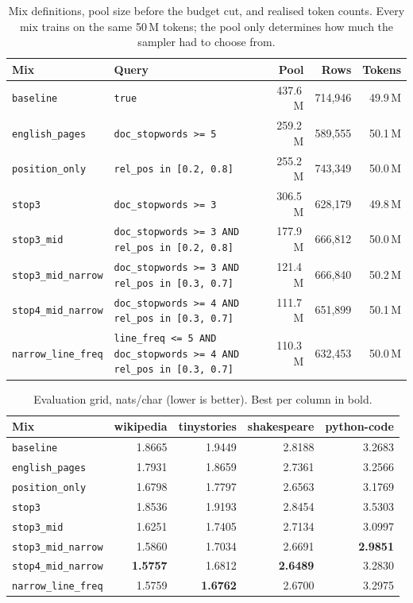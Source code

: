 \documentclass[10pt]{article}
\begin{document}
\begin{table}[htbp]
\caption{Mix definitions, pool size before the budget cut, and realised
token counts. Every mix trains on the same 50\,M tokens; the pool only
determines how much the sampler had to choose from.}
\label{tab:mixes}
\centering
\small
\begin{tabular}{llrrr}
\toprule
Mix & Query & Pool & Rows & Tokens \\
\midrule
\texttt{baseline}           & \texttt{true} & 437.6\,M & 714{,}946 & 49.9\,M \\
\texttt{english\_pages}     & \texttt{doc\_stopwords >= 5} & 259.2\,M & 589{,}555 & 50.1\,M \\
\texttt{position\_only}     & \texttt{rel\_pos in [0.2, 0.8]} & 255.2\,M & 743{,}349 & 50.0\,M \\
\texttt{stop3}              & \texttt{doc\_stopwords >= 3} & 306.5\,M & 628{,}179 & 49.8\,M \\
\texttt{stop3\_mid}         & \texttt{doc\_stopwords >= 3 AND rel\_pos in [0.2, 0.8]} & 177.9\,M & 666{,}812 & 50.0\,M \\
\texttt{stop3\_mid\_narrow} & \texttt{doc\_stopwords >= 3 AND rel\_pos in [0.3, 0.7]} & 121.4\,M & 666{,}840 & 50.2\,M \\
\texttt{stop4\_mid\_narrow} & \texttt{doc\_stopwords >= 4 AND rel\_pos in [0.3, 0.7]} & 111.7\,M & 651{,}899 & 50.1\,M \\
\texttt{narrow\_line\_freq} & \texttt{line\_freq <= 5 AND doc\_stopwords >= 4 AND rel\_pos in [0.3, 0.7]} & 110.3\,M & 632{,}453 & 50.0\,M \\
\bottomrule
\end{tabular}
\end{table}

\begin{table}[htbp]
\caption{Evaluation grid, nats/char (lower is better). Best per column in bold.}
\label{tab:grid}
\centering
\begin{tabular}{lrrrr}
\toprule
Mix & wikipedia & tinystories & shakespeare & python-code \\
\midrule
\texttt{baseline}           & 1.8665 & 1.9449 & 2.8188 & 3.2683 \\
\texttt{english\_pages}     & 1.7931 & 1.8659 & 2.7361 & 3.2566 \\
\texttt{position\_only}     & 1.6798 & 1.7797 & 2.6563 & 3.1769 \\
\texttt{stop3}              & 1.8536 & 1.9193 & 2.8454 & 3.5303 \\
\texttt{stop3\_mid}         & 1.6251 & 1.7405 & 2.7134 & 3.0997 \\
\texttt{stop3\_mid\_narrow} & 1.5860 & 1.7034 & 2.6691 & \textbf{2.9851} \\
\texttt{stop4\_mid\_narrow} & \textbf{1.5757} & 1.6812 & \textbf{2.6489} & 3.2830 \\
\texttt{narrow\_line\_freq} & 1.5759 & \textbf{1.6762} & 2.6700 & 3.2975 \\
\bottomrule
\end{tabular}
\end{table}
\end{document}
